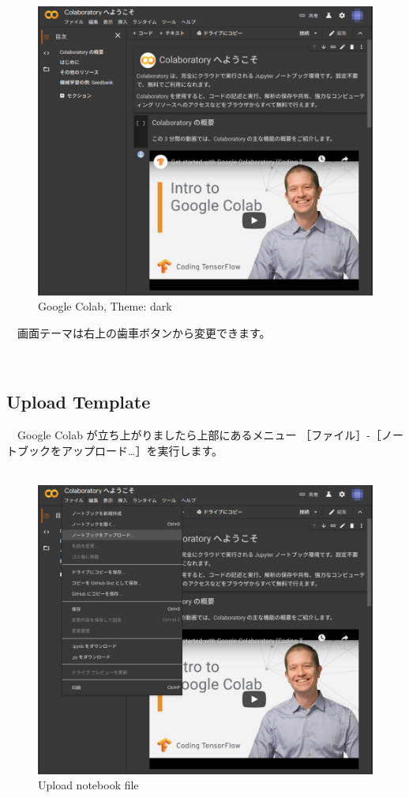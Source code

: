 \documentclass[
  12pt,
]{book}
\begin{document}
\begin{figure}[H]

{\centering \includegraphics[width=0.8\linewidth,]{fig/Colab/welcome} 

}

\caption{Google Colab, Theme: dark}\label{fig:unnamed-chunk-124}
\end{figure}

　画面テーマは右上の歯車ボタンから変更できます。

　

\hypertarget{upload-template}{%
\subsection{Upload Template}\label{upload-template}}

　Google Colab が立ち上がりましたら上部にあるメニュー ［ファイル］-［ノートブックをアップロード\ldots］を実行します。\\
　

\begin{figure}[H]

{\centering \includegraphics[width=0.8\linewidth,]{fig/Colab/upload_notebook} 

}

\caption{Upload notebook file}\label{fig:unnamed-chunk-125}
\end{figure}
\end{document}
